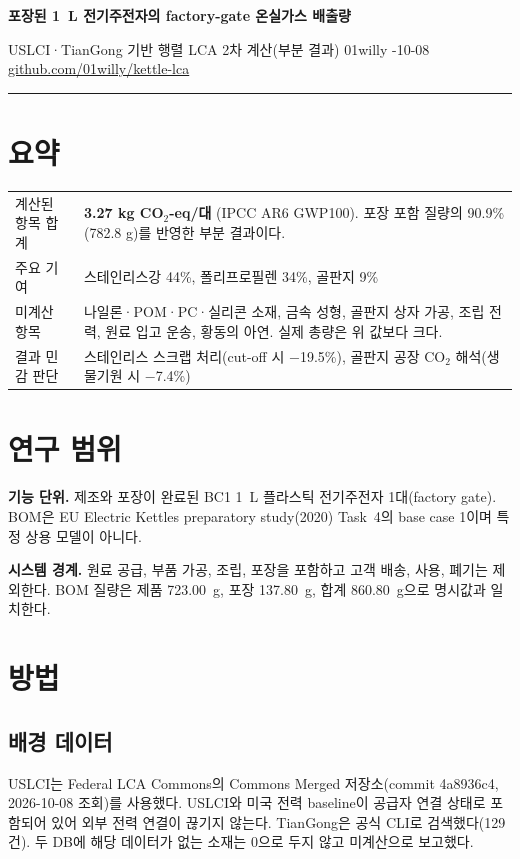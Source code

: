 \documentclass[10pt,a4paper]{article}
\begin{document}
{\LARGE\bfseries 포장된 1~L 전기주전자의 factory-gate 온실가스 배출량\par}
\vspace{2pt}
{\color{muted}USLCI·TianGong 기반 행렬 LCA 2차 계산(부분 결과) \quad 01willy -10-08 \quad
\href{https://github.com/01willy/kettle-lca}{github.com/01willy/kettle-lca}\par}
\vspace{6pt}\hrule\vspace{6pt}

\section*{요약}
\begin{tabularx}{\linewidth}{@{}lL@{}}
\toprule
계산된 항목 합계 & \textbf{3.27 kg CO$_2$-eq/대} (IPCC AR6 GWP100). 포장 포함 질량의 90.9\%(782.8 g)를 반영한 부분 결과이다. \\
주요 기여 & 스테인리스강 44\%, 폴리프로필렌 34\%, 골판지 9\% \\
미계산 항목 & 나일론·POM·PC·실리콘 소재, 금속 성형, 골판지 상자 가공, 조립 전력, 원료 입고 운송, 황동의 아연. 실제 총량은 위 값보다 크다. \\
결과 민감 판단 & 스테인리스 스크랩 처리(cut-off 시 $-$19.5\%), 골판지 공장 CO$_2$ 해석(생물기원 시 $-$7.4\%) \\
\bottomrule
\end{tabularx}

\section{연구 범위}
\textbf{기능 단위.} 제조와 포장이 완료된 BC1 1~L 플라스틱 전기주전자 1대(factory gate). BOM은 EU Electric Kettles preparatory study(2020) Task~4의 base case 1이며 특정 상용 모델이 아니다.

\textbf{시스템 경계.} 원료 공급, 부품 가공, 조립, 포장을 포함하고 고객 배송, 사용, 폐기는 제외한다. BOM 질량은 제품 723.00~g, 포장 137.80~g, 합계 860.80~g으로 명시값과 일치한다.

\section{방법}
\subsection{배경 데이터}
USLCI는 Federal LCA Commons의 Commons Merged 저장소(commit 4a8936c4, 2026-10-08 조회)를 사용했다. USLCI와 미국 전력 baseline이 공급자 연결 상태로 포함되어 있어 외부 전력 연결이 끊기지 않는다. TianGong은 공식 CLI로 검색했다(129건). 두 DB에 해당 데이터가 없는 소재는 0으로 두지 않고 미계산으로 보고했다.
\end{document}
